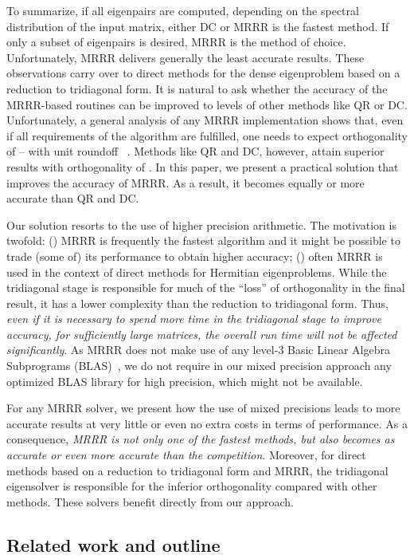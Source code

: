 \documentclass[final]{siamltex}
\begin{document}
To summarize, if all eigenpairs are computed, depending on the spectral
distribution of the input matrix, either DC or MRRR is the fastest method. If only
a subset of eigenpairs is desired, MRRR is the method of
choice. Unfortunately, MRRR delivers generally the least accurate results.   
These observations carry over to direct methods for the dense
eigenproblem based on a reduction to tridiagonal form. 
It is natural to ask whether the accuracy of the MRRR-based routines can be
improved to levels of other methods like QR or DC. 
Unfortunately, a general analysis of any MRRR implementation shows that, even if all 
requirements of the algorithm are fulfilled, one needs to expect
orthogonality of  -- with unit roundoff 
~\cite{Willems:framework}. Methods like QR and DC, however,
attain superior results with orthogonality of . In this paper, we present a practical solution that improves the
accuracy of MRRR. As a result, it becomes equally or more accurate than QR and DC.

Our solution resorts to the use of higher precision arithmetic. The motivation is
twofold: () MRRR is frequently the fastest algorithm and it might be
possible to trade (some of) its performance to obtain higher accuracy; ()
often MRRR is used in the context of direct methods for Hermitian
eigenproblems. While the tridiagonal stage is responsible for much of 
the ``loss'' of orthogonality in the final result, it has a lower complexity
than the reduction to
tridiagonal form. Thus, {\it even if it is necessary to spend more time in the
tridiagonal stage to improve accuracy, for sufficiently large matrices, the
overall run time will not be affected 
significantly}. As MRRR does not make use of
any level-3 Basic Linear Algebra Subprograms (BLAS)~\cite{blas90}, we do not
require in our mixed precision approach any optimized BLAS library for 
high precision, which might not be available. 

For any MRRR solver, we present how the use of mixed
precisions leads to more accurate results at very little or even no extra
costs in terms of performance. 
As a consequence, {\it MRRR is not only one 
of the fastest methods, but also becomes as accurate or even more accurate than the
competition}. Moreover, for direct methods based on a reduction to
tridiagonal form and MRRR, the tridiagonal eigensolver is responsible for
the inferior orthogonality compared with other methods. These solvers
benefit directly 
from our approach. 

\subsection{Related work and outline}
\label{sec:relatedwork}
\end{document}
